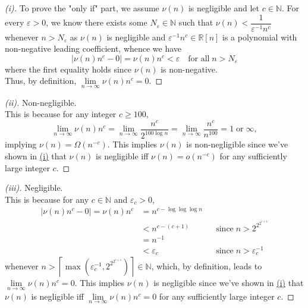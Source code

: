 \begin{proof}[(i)]
    To prove the "only if" part, we assume $\nu(n)$ is negligible and let $c\in \mathbb{N}$. For every $\varepsilon\gt 0$, we know there exists some $N_\varepsilon \in \mathbb{N}$ such that $\nu(n)\lt \dfrac{1}{\varepsilon^{-1}n^c}$ whenever $n\gt N_\varepsilon$ as  $\nu(n)$ is negligible and $\varepsilon^{-1}n^c\in \mathbb{R}[n]$ is a polynomial with non-negative leading coefficient, whence we have
    \[
    |\nu(n)n^c-0| = \nu(n)n^c \lt \varepsilon \quad \text{for all} \; n\gt N_\varepsilon
    \]
    where the first equality holds since $\nu(n)$ is non-negative.\\
    Thus, by definition, $\lim\limits_{n\to \infty} \nu(n)n^c = 0$.

\end{proof}

\begin{proof}[(ii)]
    Non-negligible.\\
    This is because for any integer $c\ge 100$, 
    \[ \lim\limits_{n\to \infty} \nu(n)n^c = \lim\limits_{n\to \infty} \dfrac{n^{c}}{2^{100\log n}} = \lim\limits_{n\to \infty} \dfrac{n^{c}}{n^{100}}=1\;\text{or}\; \infty,\] implying $\nu(n)=\Omega(n^{-c})$. This implies $\nu(n)$ is non-negligible since we've shown in \hyperref[pf:1-i]{(i)} that $\nu(n)$ is negligible iff $\nu(n)=o(n^{-c})$ for any sufficiently large integer $c$.
\end{proof}

\begin{proof}[(iii)]
    Negligible.\\
    This is because for any $c\in \mathbb{N}$ and $\varepsilon_c \gt 0$, 
    \begin{align*}
        |\nu(n)n^c-0|=\nu(n)n^c&=n^{c-\log\log\log n}\\
        &\lt n^{c-(c+1)} && \text{since} \; n\gt 2^{2^{2^{c+1}}}\\
        &= n^{-1} \\
        &\lt \varepsilon_c && \text{since} \; n\gt \varepsilon_c^{-1}
    \end{align*}
    whenever $n\gt \left\lceil\max\left(\varepsilon_c^{-1}, 2^{2^{2^{c+1}}}\right)\right\rceil \in \mathbb{N}$, which, by definition, leads to $\lim\limits_{n\to \infty} \nu(n)n^c = 0$. This implies $\nu(n)$ is negligible since we've shown in \hyperref[pf:1-i]{(i)} that $\nu(n)$ is negligible iff $\lim\limits_{n\to \infty} \nu(n)n^c = 0$ for any sufficiently large integer $c$.
\end{proof}


